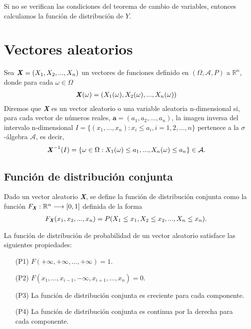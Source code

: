 Si no se verifican las condiciones del teorema de cambio de variables, entonces calculamos la función de distribución de $Y$.

\section{Vectores aleatorios}

\begin{defi}
    Sea $\textbf{\textit{X}} = (X_1, X_2,..., X_n)$ un vectores de funciones definido en $(\Omega, \mathcal{A}, P)$ a $\mathbb{R}^n$, donde para cada $\omega \in \Omega$
    \begin{align*}
        \textbf{\textit{X}}(\omega) = (X_1(\omega), X_2(\omega),..., X_n(\omega))
    \end{align*}
    Diremos que \textbf{\textit{X}} es un vector aleatorio o una variable aleatoria n-dimensional si, para cada vector de números reales, $\textbf{a} = (a_1,a_2,...,a_n)$, la imagen inversa del intervalo n-dimensional $I = \{ (x_1,...,x_n) : x_i \leq a_i, i = 1,2,...,n \}$ pertenece a la $\sigma$-álgebra $\mathcal{A}$, es decir,
    \begin{align*}
        \textbf{\textit{X}}^{-1}(I) = \{ \omega \in \Omega : X_1(\omega) \leq a_1, ..., X_n(\omega) \leq a_n \} \in \mathcal{A}.
    \end{align*}
\end{defi}

\subsection{Función de distribución conjunta}

Dado un vector aleatorio \textbf{\textit{X}}, se define la función de distribución conjunta como la función $F_{\textbf{\textit{X}}} : \mathbb{R}^n \longrightarrow [0,1]$ definida de la forma
\begin{align*}
    F_{\textbf{\textit{X}}}(x_1,x_2,...,x_n) = P(X_1 \leq x_1, X_2 \leq x_2, ..., X_n \leq x_n).
\end{align*}

\begin{teo}
    La función de distribución de probabilidad de un vector aleatorio satisface las siguientes propiedades:
    \begin{enumerate}
        \item[(P1)] $F(+\infty,+\infty,...,+\infty) = 1$.
        \item[(P2)] $F(x_1,...,x_{i-1},-\infty,x_{i+1},...,x_n) = 0$.
        \item[(P3)] La función de distribución conjunta es creciente para cada componente.
        \item[(P4)] La función de distribución conjunta es continua por la derecha para cada componente.
    \end{enumerate}
\end{teo}


